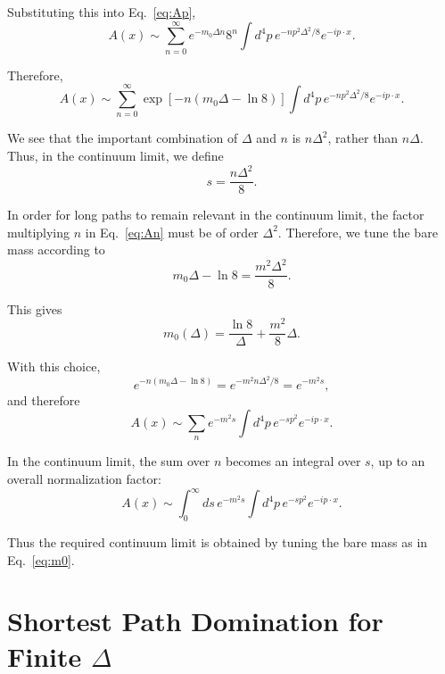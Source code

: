 \documentclass[12pt,a4paper]{article}
\begin{document}
Substituting this into Eq.~\eqref{eq:Ap},
\begin{equation}
A(x)
\sim
\sum_{n=0}^{\infty}
e^{-m_0\Delta n}
8^n
\int d^4p\,
e^{-np^2\Delta^2/8}
e^{-ip\cdot x}.
\end{equation}

Therefore,
\begin{equation}
A(x)
\sim
\sum_{n=0}^{\infty}
\exp\left[
-n\left(m_0\Delta-\ln 8\right)
\right]
\int d^4p\,
e^{-np^2\Delta^2/8}
e^{-ip\cdot x}.
\label{eq:An}
\end{equation}

We see that the important combination of $\Delta$ and $n$ is
$n\Delta^2$, rather than $n\Delta$. Thus, in the continuum limit, we define
\begin{equation}
s=\frac{n\Delta^2}{8}.
\label{eq:sdef}
\end{equation}

In order for long paths to remain relevant in the continuum limit, the
factor multiplying $n$ in Eq.~\eqref{eq:An} must be of order $\Delta^2$.
Therefore, we tune the bare mass according to
\begin{equation}
m_0\Delta-\ln 8
=
\frac{m^2\Delta^2}{8}.
\label{eq:mass-tuning}
\end{equation}

This gives
\begin{equation}
\boxed{
m_0(\Delta)
=
\frac{\ln 8}{\Delta}
+
\frac{m^2}{8}\Delta
}.
\label{eq:m0}
\end{equation}

With this choice,
\begin{equation}
e^{-n(m_0\Delta-\ln8)}
=
e^{-m^2n\Delta^2/8}
=
e^{-m^2s},
\end{equation}
and therefore
\begin{equation}
A(x)
\sim
\sum_n
e^{-m^2s}
\int d^4p\,
e^{-sp^2}
e^{-ip\cdot x}.
\end{equation}

In the continuum limit, the sum over $n$ becomes an integral over $s$, up to
an overall normalization factor:
\begin{equation}
A(x)
\sim
\int_0^\infty ds\,
e^{-m^2s}
\int d^4p\,
e^{-sp^2}
e^{-ip\cdot x}.
\end{equation}

Thus the required continuum limit is obtained by tuning the bare mass as in
Eq.~\eqref{eq:m0}.
\section*{Shortest Path Domination for Finite $\Delta$}
\end{document}
